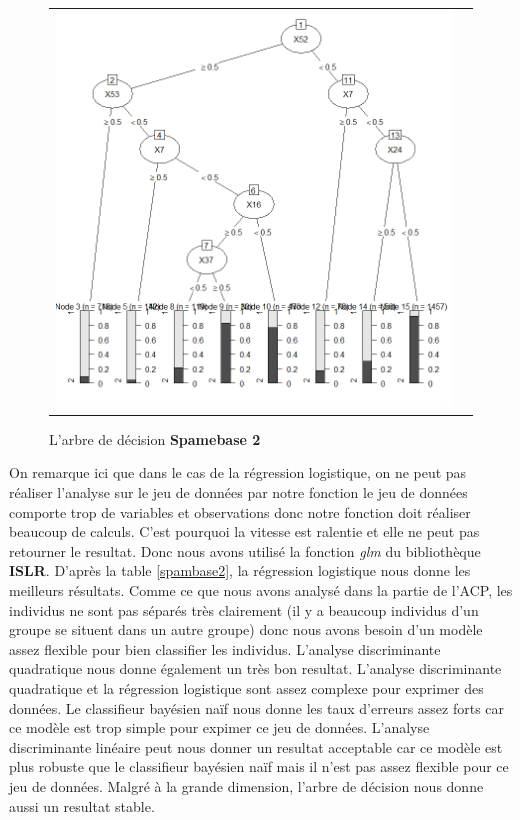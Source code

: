 \documentclass[a4paper,11pt,oneside,roman]{article}
\begin{document}
\begin{figure}[htb]
    \centering
    \begin{tabular}{cc}
    \includegraphics[scale = .4]{./discrimination/spambase2/treeplot.png} &
    \end{tabular}
    \caption{L'arbre de décision \textbf{Spamebase 2}}
    \label{fig:my_label}
\end{figure}
On remarque ici que dans le cas de la régression logistique, on ne peut pas réaliser l'analyse sur le jeu de données par notre fonction le jeu de données comporte trop de variables et observations donc notre fonction doit réaliser beaucoup de calculs. C'est pourquoi la vitesse est ralentie et elle ne peut pas retourner le resultat. Donc nous avons utilisé la fonction \textit{glm} du bibliothèque \textbf{ISLR}. 
\newline
D'après la table \ref{spambase2}, la régression logistique nous donne les meilleurs résultats. Comme ce que nous avons analysé dans la partie de l'ACP, les individus ne sont pas séparés très clairement (il y a beaucoup individus d'un groupe se situent dans un autre groupe) donc nous avons besoin d'un modèle assez flexible pour bien classifier les individus. L'analyse discriminante quadratique nous donne également un très bon resultat. L'analyse discriminante quadratique et la régression logistique sont assez complexe pour exprimer des données. Le classifieur bayésien naïf nous donne les taux d'erreurs assez forts car ce modèle est trop simple pour expimer ce jeu de données. L'analyse discriminante linéaire peut nous donner un resultat acceptable car ce modèle est plus robuste que le classifieur bayésien naïf mais il n'est pas assez flexible pour ce jeu de données. Malgré à la grande dimension, l'arbre de décision nous donne aussi un resultat stable.  
\end{document}
